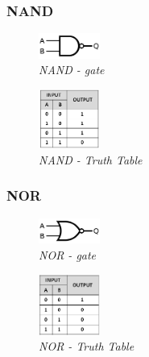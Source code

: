 \documentclass{article}
\begin{document}
\subsubsection{NAND}
\begin{figure}[h]
\begin{center}
\begin{minipage}[b]{4cm}
\centering
\includegraphics[width=2cm]{nand_gate.png}\\\textit{NAND - gate}
\end{minipage}
\begin{minipage}[b]{2cm}
\centering
\includegraphics[width=2cm]{nand_truthtable.png}\\\textit{NAND - Truth Table}
\end{minipage}
\end{center}
\end{figure}
\subsubsection{NOR}
\begin{figure}[h]
\begin{center}
\begin{minipage}[b]{4cm}
\centering
\includegraphics[width=2cm]{nor_gate.png}\\\textit{NOR - gate}
\end{minipage}
\begin{minipage}[b]{2cm}
\centering
\includegraphics[width=2cm]{nor_truthtable.png}\\\textit{NOR - Truth Table}
\end{minipage}
\end{center}
\end{figure}
\end{document}
